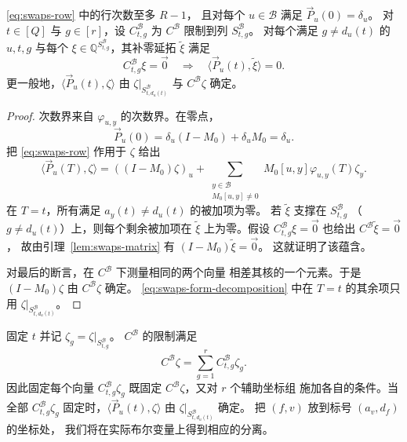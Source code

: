 \begin{lemma}\label{lem:swaps-forms}
\eqref{eq:swaps-row} 中的行次数至多 $R-1$，
且对每个 $u\in\mathcal B$ 满足 $\vec{P}_u(0)=\delta_u$。
对 $t\in[Q]$ 与 $g\in[r]$，设 $C^{\mathcal B}_{t,g}$
为 $C^{\mathcal B}$ 限制到列 $S^{\mathcal B}_{t,g}$。
对每个满足 $g\ne d_u(t)$ 的 $u,t,g$ 与每个
$\xi\in\mathbb Q^{S^{\mathcal B}_{t,g}}$，其补零延拓
$\widetilde\xi$ 满足
\[
 C^{\mathcal B}_{t,g}\xi=\vec{0}
 \quad\Longrightarrow\quad \langle \vec{P}_u(t), \widetilde\xi\rangle=0.
\]
更一般地，$\langle \vec{P}_u(t), \zeta\rangle$
由 $\zeta|_{S^{\mathcal B}_{t,d_u(t)}}$ 与
$C^{\mathcal B}\zeta$ 确定。
\end{lemma}
\begin{proof}
次数界来自 $\varphi_{u,y}$ 的次数界。在零点，
\[
 \vec{P}_u(0)=\delta_u(I-M_0)+\delta_uM_0=\delta_u.
\]
把 \eqref{eq:swaps-row} 作用于 $\zeta$ 给出
\begin{equation}\label{eq:swaps-form-decomposition}
 \langle \vec{P}_u(T), \zeta\rangle=((I-M_0)\zeta)_u+
 \sum_{\substack{y\in\mathcal B\\M_0[u,y]\ne0}}
 M_0[u,y]\varphi_{u,y}(T)\zeta_y.
\end{equation}
在 $T=t$，所有满足 $a_y(t)\ne d_u(t)$ 的被加项为零。
若 $\widetilde\xi$ 支撑在 $S^{\mathcal B}_{t,g}$
（$g\ne d_u(t)$）上，则每个剩余被加项在 $\widetilde\xi$
上为零。假设 $C^{\mathcal B}_{t,g}\xi=\vec{0}$
也给出 $C^{\mathcal B}\widetilde\xi=\vec{0}$，
故由引理~\ref{lem:swaps-matrix} 有
$(I-M_0)\widetilde\xi=\vec{0}$。
这就证明了该蕴含。

对最后的断言，在 $C^{\mathcal B}$ 下测量相同的两个向量
相差其核的一个元素。于是 $(I-M_0)\zeta$
由 $C^{\mathcal B}\zeta$ 确定。
\eqref{eq:swaps-form-decomposition} 中在 $T=t$
的其余项只用 $\zeta|_{S^{\mathcal B}_{t,d_u(t)}}$。
\end{proof}

固定 $t$ 并记 $\zeta_g=\zeta|_{S^{\mathcal B}_{t,g}}$。
$C^{\mathcal B}$ 的限制满足
\begin{equation}\label{eq:auxiliary-measurements}
 C^{\mathcal B}\zeta=\sum_{g=1}^r C^{\mathcal B}_{t,g}\zeta_g.
\end{equation}
因此固定每个向量 $C^{\mathcal B}_{t,g}\zeta_g$
既固定 $C^{\mathcal B}\zeta$，又对 $r$ 个辅助坐标组
施加各自的条件。当全部 $C^{\mathcal B}_{t,g}\zeta_g$
固定时，$\langle \vec{P}_u(t), \zeta\rangle$
由 $\zeta|_{S^{\mathcal B}_{t,d_u(t)}}$ 确定。
把 $(f,v)$ 放到标号 $(a_v,d_f)$ 的坐标处，
我们将在实际布尔变量上得到相应的分离。

